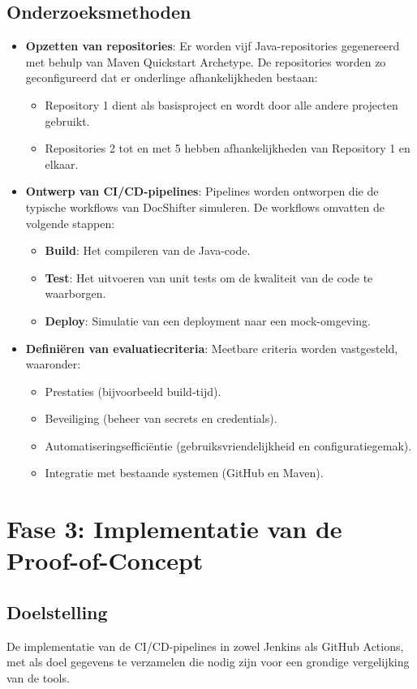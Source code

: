 \subsection*{Onderzoeksmethoden}
\begin{itemize}
    \item \textbf{Opzetten van repositories}: Er worden vijf Java-repositories gegenereerd met behulp van Maven Quickstart Archetype. De repositories worden zo geconfigureerd dat er onderlinge afhankelijkheden bestaan: 
    \begin{itemize}
        \item Repository 1 dient als basisproject en wordt door alle andere projecten gebruikt.
        \item Repositories 2 tot en met 5 hebben afhankelijkheden van Repository 1 en elkaar.
    \end{itemize}
    \item \textbf{Ontwerp van CI/CD-pipelines}: Pipelines worden ontworpen die de typische workflows van DocShifter simuleren. De workflows omvatten de volgende stappen:
    \begin{itemize}
        \item \textbf{Build}: Het compileren van de Java-code.
        \item \textbf{Test}: Het uitvoeren van unit tests om de kwaliteit van de code te waarborgen.
        \item \textbf{Deploy}: Simulatie van een deployment naar een mock-omgeving.
    \end{itemize}
    \item \textbf{Definiëren van evaluatiecriteria}: Meetbare criteria worden vastgesteld, waaronder:
    \begin{itemize}
        \item Prestaties (bijvoorbeeld build-tijd).
        \item Beveiliging (beheer van secrets en credentials).
        \item Automatiseringsefficiëntie (gebruiksvriendelijkheid en configuratiegemak).
        \item Integratie met bestaande systemen (GitHub en Maven). 
    \end{itemize}
\end{itemize}

\section{Fase 3: Implementatie van de Proof-of-Concept}
\subsection*{Doelstelling}
De implementatie van de CI/CD-pipelines in zowel Jenkins als GitHub Actions, met als doel gegevens te verzamelen die nodig zijn voor een grondige vergelijking van de tools.

